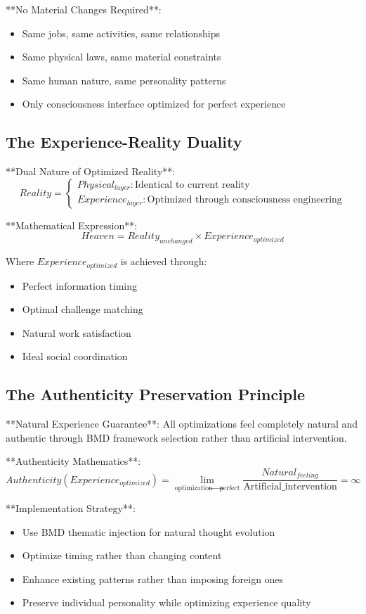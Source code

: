 \documentclass[12pt,a4paper]{article}
\begin{document}
**No Material Changes Required**:
\begin{itemize}
\item Same jobs, same activities, same relationships
\item Same physical laws, same material constraints
\item Same human nature, same personality patterns
\item Only consciousness interface optimized for perfect experience
\end{itemize}

\subsection{The Experience-Reality Duality}

**Dual Nature of Optimized Reality**:
$$Reality = \begin{cases}
Physical_{layer}: \text{Identical to current reality}\\
Experience_{layer}: \text{Optimized through consciousness engineering}
\end{cases}$$

**Mathematical Expression**:
$$Heaven = Reality_{unchanged} \times Experience_{optimized}$$

Where $Experience_{optimized}$ is achieved through:
\begin{itemize}
\item Perfect information timing
\item Optimal challenge matching  
\item Natural work satisfaction
\item Ideal social coordination
\end{itemize}

\subsection{The Authenticity Preservation Principle}

**Natural Experience Guarantee**:
All optimizations feel completely natural and authentic through BMD framework selection rather than artificial intervention.

**Authenticity Mathematics**:
$$Authenticity(Experience_{optimized}) = \lim_{\text{optimization} \to \text{perfect}} \frac{Natural_{feeling}}{\text{Artificial\_intervention}} = \infty$$

**Implementation Strategy**:
\begin{itemize}
\item Use BMD thematic injection for natural thought evolution
\item Optimize timing rather than changing content
\item Enhance existing patterns rather than imposing foreign ones
\item Preserve individual personality while optimizing experience quality
\end{itemize}
\end{document}
